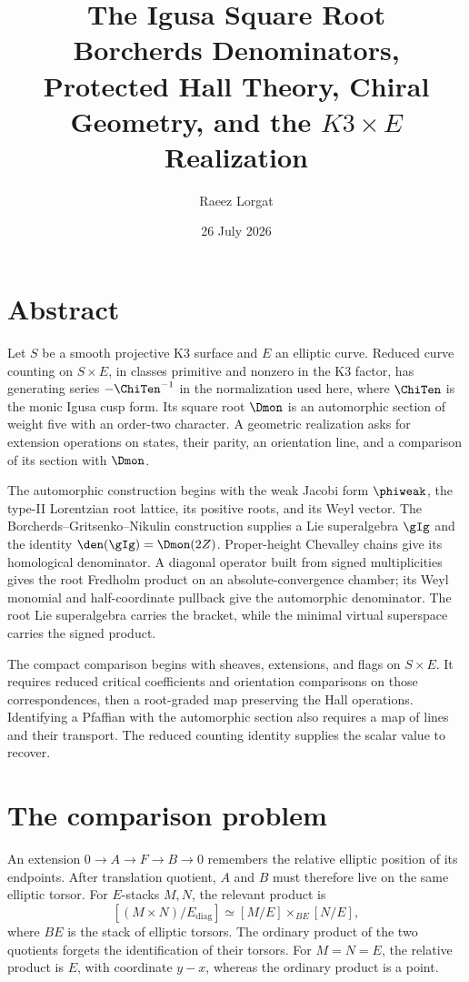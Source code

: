 \documentclass[11pt,twoside,openright]{memoir}
\title{\texorpdfstring{\textbf{The Igusa Square Root}\\[0.55em]\Large Borcherds Denominators, Protected Hall Theory, Chiral Geometry, and the $K3\times E$ Realization}{The Igusa Square Root: Borcherds Denominators, Protected Hall Theory, Chiral Geometry, and the K3 x E Realization}}
\author{Raeez Lorgat}
\date{26 July 2026}
\begin{document}
\frontmatter
\maketitle
\thispagestyle{empty}
\cleardoublepage
\chapter*{Abstract}

Let \(S\) be a smooth projective K3 surface and \(E\) an elliptic
curve. Reduced curve counting on \(S\times E\), in classes primitive
and nonzero in the K3 factor, has generating series \(-\ChiTen^{-1}\) in the normalization used here,
where \(\ChiTen\) is the monic Igusa cusp form. Its square root \(\Dmon\) is an
automorphic section of weight five with an order-two character.
A geometric realization asks for extension operations on states,
their parity, an orientation line, and a comparison of its section
with \(\Dmon\).

The automorphic construction begins with the weak Jacobi form
\(\phiweak\), the type-II Lorentzian root lattice, its positive
roots, and its Weyl vector. The Borcherds--Gritsenko--Nikulin
construction supplies a Lie superalgebra \(\gIg\) and the identity
\(\den(\gIg)=\Dmon(2Z)\). Proper-height Chevalley chains give its
homological denominator. A diagonal operator built from signed multiplicities gives the root
Fredholm product on an absolute-convergence chamber; its Weyl monomial
and half-coordinate pullback give the automorphic denominator. The root Lie superalgebra carries the bracket, while the
minimal virtual superspace carries the signed product.

The compact comparison begins with sheaves, extensions, and flags on
\(S\times E\). It requires reduced critical coefficients and
orientation comparisons on those correspondences, then a root-graded
map preserving the Hall operations. Identifying a Pfaffian with the
automorphic section also requires a map of lines and their transport.
The reduced counting identity supplies the scalar value to recover.

\chapter*{The comparison problem}
An extension \(0\to A\to F\to B\to0\) remembers the relative
elliptic position of its endpoints. After translation quotient,
\(A\) and \(B\) must therefore live on the same elliptic torsor.
For \(E\)-stacks \(M,N\), the relevant product is
\[
 [(M\times N)/E_{\mathrm{diag}}]
 \simeq[M/E]\times_{BE}[N/E],
\]
where \(BE\) is the stack of elliptic torsors. The ordinary product
of the two quotients forgets the identification of their torsors.
For \(M=N=E\), the relative product is \(E\), with coordinate
\(y-x\), whereas the ordinary product is a point.
\end{document}
